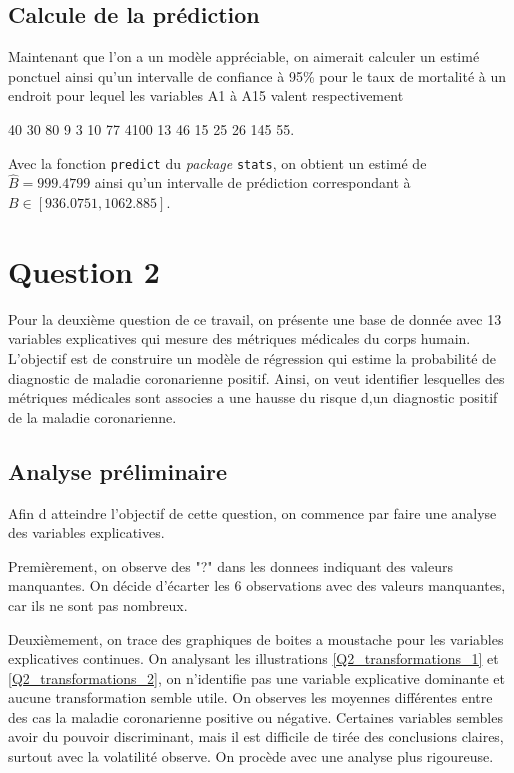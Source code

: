\documentclass{article}
\begin{document}
	\subsection{Calcule de la prédiction}
	Maintenant que l'on a un modèle appréciable, on aimerait calculer un estimé ponctuel ainsi qu’un intervalle de confiance à 95\% pour le taux de mortalité à un endroit pour lequel les variables A1 à A15 valent respectivement
	\begin{center}
		40 30 80 9 3 10 77 4100 13 46 15 25 26 145 55.
	\end{center}
	Avec la fonction \texttt{predict} du \textit{package} \texttt{stats}, on obtient un estimé de $\hat{B} = 999.4799$ ainsi qu'un intervalle de prédiction correspondant à  $B \in [936.0751, 1062.885]$.
	
\section{Question 2}
	Pour la deuxième question de ce travail, on présente une base de donnée avec 13 variables explicatives qui mesure des métriques médicales du corps humain. L'objectif est de construire un modèle de régression qui estime la probabilité de diagnostic de maladie coronarienne positif. Ainsi, on veut identifier lesquelles des métriques médicales sont associes a une hausse du risque d,un diagnostic positif de la maladie coronarienne.
	
	\subsection{Analyse préliminaire}
	
	Afin d atteindre l'objectif de cette question, on commence par faire une analyse des variables explicatives. 
	
	Premièrement, on observe des "?" dans les donnees indiquant des valeurs manquantes. On décide d'écarter les 6 observations avec des valeurs manquantes, car ils ne sont pas nombreux.
	
	Deuxièmement, on trace des graphiques de boites a moustache pour les variables explicatives continues. On analysant les illustrations \ref{Q2_transformations_1} et \ref{Q2_transformations_2}, on n'identifie pas une variable explicative dominante et aucune transformation semble utile. On observes les moyennes différentes entre des cas la maladie coronarienne  positive ou négative. Certaines variables sembles avoir du pouvoir discriminant, mais il est difficile de tirée des conclusions claires, surtout avec la volatilité observe. On procède avec une analyse plus rigoureuse. 
	
\end{document}
